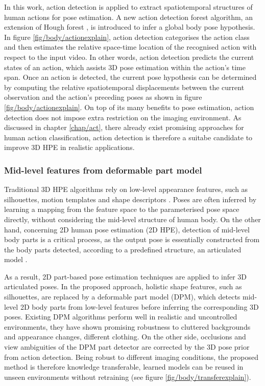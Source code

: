 In this work, action detection is applied to extract spatiotemporal structures of human actions for pose estimation. A new action detection forest algorithm, an extension of Hough forest \cite{Gall2009}, is introduced to infer a global body pose hypothesis.   
In figure \ref{fig/body/actionexplain}, action detection categorises the action class and then estimates the relative space-time location of the recognised action with respect to the input video. In other words, action detection predicts the current states of an action, which assists 3D pose estimation within the action's time span. Once an action is detected, the current pose hypothesis can be determined by computing the relative spatiotemporal displacements between the current observation and the action's preceding poses as shown in figure \ref{fig/body/actionexplain}.   
On top of its many benefits to pose estimation, action detection does not impose extra restriction on the imaging environment. As discussed in chapter \ref{chap/act}, there already exist promising approaches for human action classification, action detection is therefore a suitabe candidate to improve 3D HPE in realistic applications.   

\subsubsection{Mid-level features from deformable part model} 

Traditional 3D HPE algorithms rely on low-level appearance features, such as silhouettes, motion templates and shape descriptors \cite{Hogg1983, Rogez2012, Navaratnam2006, Pons-Moll2011, Sigal2012}. Poses are often inferred by learning a mapping from the feature space to the parameterised pose space directly, without considering the mid-level structure of human body.  
On the other hand, concerning 2D human pose estimation (2D HPE), detection of mid-level body parts is a critical process, as the output pose is essentially constructed from the body parts detected, according to a predefined structure, \eg an articulated model \cite{Felzenszwalb2000, Andriluka2009, Yang2011, Eichner2012}.

As a result, 2D part-based pose estimation techniques are applied to infer 3D articulated poses. In the proposed approach, holistic shape features, such as silhouettes, are replaced by a deformable part model (DPM), which detects mid-level 2D body parts from low-level features before inferring the corresponding 3D poses. Existing DPM algorithms perform well in realistic and uncontrolled environments, they have shown promising robustness to cluttered backgrounds and appearance changes, \eg different clothing. On the other side, occlusions and view ambiguities of the DPM part detector are corrected by the 3D pose prior from action detection. Being robust to different imaging conditions, the proposed method is therefore knowledge transferable, learned models can be reused in unseen environments without retraining (see figure \ref{fig/body/transferexplain}). 

